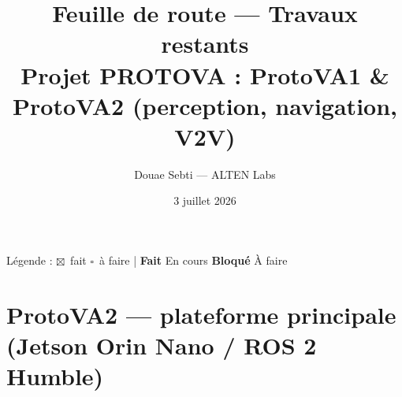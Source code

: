 \documentclass[a4paper,10pt]{article}
\title{\textbf{Feuille de route --- Travaux restants}\\[2mm]
\large Projet PROTOVA : ProtoVA1 \& ProtoVA2 (perception, navigation, V2V)}
\author{Douae Sebti --- ALTEN Labs}
\date{3 juillet 2026}
\newcommand{\ok}{\textcolor{done}{$\boxtimes$}}
\newcommand{\tdo}{$\square$}
\newcommand{\Fait}{\textcolor{done}{\textbf{Fait}}}
\newcommand{\Enc}{\textcolor{prog}{En cours}}
\newcommand{\Bloq}{\textcolor{prog}{\textbf{Bloqué}}}
\newcommand{\Af}{\textcolor{todo}{À faire}}
\begin{document}
\maketitle
\vspace{-4pt}

\begin{center}\small
Légende : \ok~fait \quad \tdo~à faire \quad|\quad
\Fait{} \quad \Enc{} \quad \Bloq{} \quad \Af{}
\end{center}

\section{ProtoVA2 --- plateforme principale (Jetson Orin Nano / ROS 2 Humble)}
\vspace{2pt}
\end{document}
